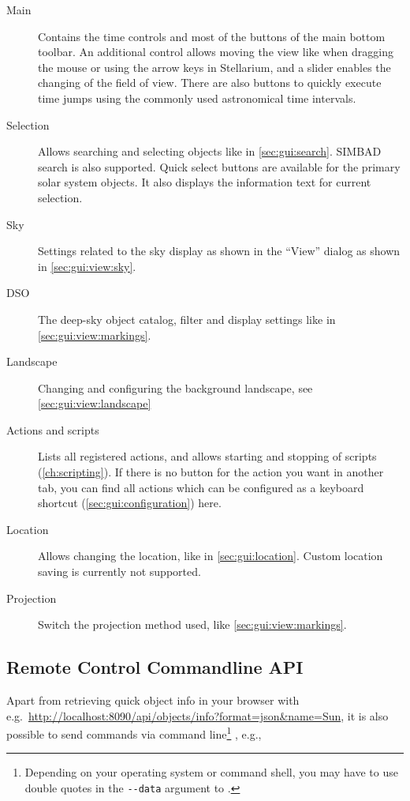 \begin{description}
\item[Main] Contains the time controls and most of the buttons of the 
main bottom toolbar. An additional control allows moving the view like when 
dragging the mouse or using the arrow keys in Stellarium, and a slider enables 
the changing of the field of view. There are also buttons to quickly execute 
time jumps using the commonly used astronomical time intervals.
\item[Selection] Allows searching and selecting objects like in \autoref{sec:gui:search}. 
SIMBAD search is also supported. Quick select buttons are available for the 
primary solar system objects. It also displays the information text for current 
selection.
\item[Sky] Settings related to the sky display as shown in the ``View'' dialog 
as shown in \autoref{sec:gui:view:sky}.
\item[DSO] The deep-sky object catalog, filter and display settings like in 
\autoref{sec:gui:view:markings}.
\item[Landscape] Changing and configuring the background landscape, see 
\autoref{sec:gui:view:landscape}
\item[Actions and scripts] Lists all registered actions, and allows starting 
and stopping of scripts (\autoref{ch:scripting}). If there is no button for the 
action you want in another tab, you can find all actions which can be 
configured as a keyboard shortcut (\autoref{sec:gui:configuration}) here.
\item[Location] Allows changing the location, like in 
\autoref{sec:gui:location}. Custom location saving is currently not 
supported.
\item[Projection] Switch the projection method used, like \autoref{sec:gui:view:markings}.
\end{description}

\subsection{Remote Control Commandline API}
\label{sec:plugins:RemoteControl:CLI}

Apart from retrieving quick object info in your browser with e.g.\ \url{http://localhost:8090/api/objects/info?format=json&name=Sun},
it is also possible to send commands via command line\footnote{%
  Depending on your operating system or command shell,
  you may have to use double quotes in the \texttt{-\/-data} argument to .}%
, e.g.,


